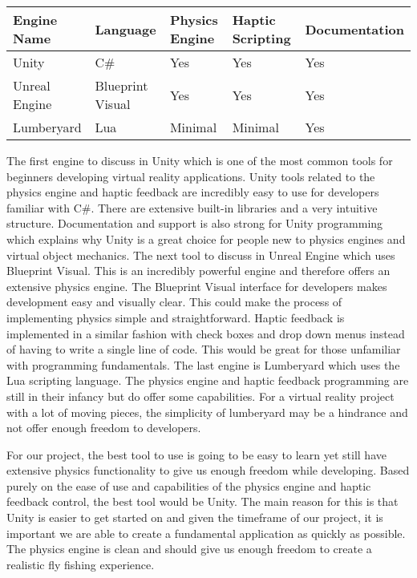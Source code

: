 \documentclass[10pt,journal,compsoc,onecolumn, draftclsnofoot]{IEEEtran}
\begin{document}
\vspace{2mm}
\begin{table}[h!]
\centering
  \begin{tabu} to 1.0\textwidth { | X[l] || X[c] | X[c] | X[c] | X[c] |  }
  \hline
  Engine Name & Language & Physics Engine & Haptic Scripting & Documentation\\
  \hline
  Unity  & C\# & Yes & Yes & Yes\\
  Unreal Engine &   Blueprint Visual  & Yes & Yes & Yes\\
  Lumberyard & Lua & Minimal & Minimal & Yes \\
  \hline
  \end{tabu}
\end{table}
\vspace{2mm}

The first engine to discuss in Unity which is one of the most common tools for beginners developing virtual reality applications.
Unity tools related to the physics engine and haptic feedback are incredibly easy to use for developers familiar with C\#.
There are extensive built-in libraries and a very intuitive structure.
Documentation and support is also strong for Unity programming which explains why Unity is a great choice for people new to physics engines and virtual object mechanics.
The next tool to discuss in Unreal Engine which uses Blueprint Visual.
This is an incredibly powerful engine and therefore offers an extensive physics engine.
The Blueprint Visual interface for developers makes development easy and visually clear.
This could make the process of implementing physics simple and straightforward.
Haptic feedback is implemented in a similar fashion with check boxes and drop down menus instead of having to write a single line of code.
This would be great for those unfamiliar with programming fundamentals.
The last engine is Lumberyard which uses the Lua scripting language.
The physics engine and haptic feedback programming are still in their infancy but do offer some capabilities.
For a virtual reality project with a lot of moving pieces, the simplicity of lumberyard may be a hindrance and not offer enough freedom to developers.

For our project, the best tool to use is going to be easy to learn yet still have extensive physics functionality to give us enough freedom while developing.
Based purely on the ease of use and capabilities of the physics engine and haptic feedback control, the best tool would be Unity.
The main reason for this is that Unity is easier to get started on and given the timeframe of our project, it is important we are able to create a fundamental application as quickly as possible.
The physics engine is clean and should give us enough freedom to create a realistic fly fishing experience.
\vspace{2mm}
\end{document}
